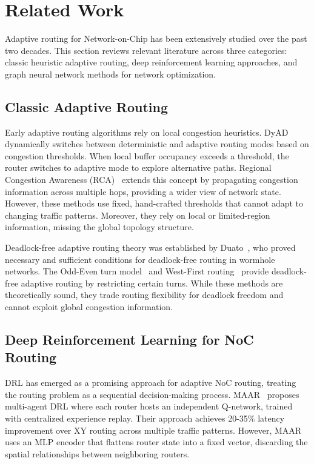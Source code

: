 \section{Related Work}
\label{sec:related}

Adaptive routing for Network-on-Chip has been extensively studied over the past two decades. This section reviews relevant literature across three categories: classic heuristic adaptive routing, deep reinforcement learning approaches, and graph neural network methods for network optimization.

\subsection{Classic Adaptive Routing}

Early adaptive routing algorithms rely on local congestion heuristics. DyAD~\cite{dyad2004} dynamically switches between deterministic and adaptive routing modes based on congestion thresholds. When local buffer occupancy exceeds a threshold, the router switches to adaptive mode to explore alternative paths. Regional Congestion Awareness (RCA)~\cite{ebrahimi2019} extends this concept by propagating congestion information across multiple hops, providing a wider view of network state. However, these methods use fixed, hand-crafted thresholds that cannot adapt to changing traffic patterns. Moreover, they rely on local or limited-region information, missing the global topology structure.

Deadlock-free adaptive routing theory was established by Duato~\cite{duato1996,duato1993}, who proved necessary and sufficient conditions for deadlock-free routing in wormhole networks. The Odd-Even turn model~\cite{odd2000} and West-First routing~\cite{glass1992} provide deadlock-free adaptive routing by restricting certain turns. While these methods are theoretically sound, they trade routing flexibility for deadlock freedom and cannot exploit global congestion information.

\subsection{Deep Reinforcement Learning for NoC Routing}

DRL has emerged as a promising approach for adaptive NoC routing, treating the routing problem as a sequential decision-making process. MAAR~\cite{wang2022maar} proposes multi-agent DRL where each router hosts an independent Q-network, trained with centralized experience replay. Their approach achieves 20-35\% latency improvement over XY routing across multiple traffic patterns. However, MAAR uses an MLP encoder that flattens router state into a fixed vector, discarding the spatial relationships between neighboring routers.

